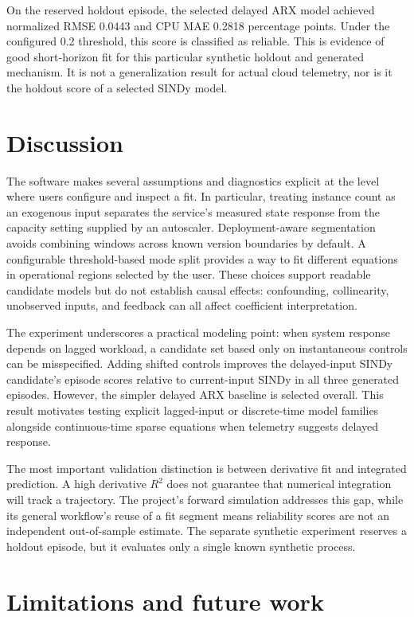 \documentclass[11pt]{article}
\begin{document}
On the reserved holdout episode, the selected delayed ARX model achieved normalized RMSE 0.0443 and CPU MAE 0.2818 percentage points. Under the configured 0.2 threshold, this score is classified as reliable. This is evidence of good short-horizon fit for this particular synthetic holdout and generated mechanism. It is not a generalization result for actual cloud telemetry, nor is it the holdout score of a selected SINDy model.

\section{Discussion}

The software makes several assumptions and diagnostics explicit at the level where users configure and inspect a fit. In particular, treating instance count as an exogenous input separates the service's measured state response from the capacity setting supplied by an autoscaler. Deployment-aware segmentation avoids combining windows across known version boundaries by default. A configurable threshold-based mode split provides a way to fit different equations in operational regions selected by the user. These choices support readable candidate models but do not establish causal effects: confounding, collinearity, unobserved inputs, and feedback can all affect coefficient interpretation.

The experiment underscores a practical modeling point: when system response depends on lagged workload, a candidate set based only on instantaneous controls can be misspecified. Adding shifted controls improves the delayed-input SINDy candidate's episode scores relative to current-input SINDy in all three generated episodes. However, the simpler delayed ARX baseline is selected overall. This result motivates testing explicit lagged-input or discrete-time model families alongside continuous-time sparse equations when telemetry suggests delayed response.

The most important validation distinction is between derivative fit and integrated prediction. A high derivative $R^2$ does not guarantee that numerical integration will track a trajectory. The project's forward simulation addresses this gap, while its general workflow's reuse of a fit segment means reliability scores are not an independent out-of-sample estimate. The separate synthetic experiment reserves a holdout episode, but it evaluates only a single known synthetic process.

\section{Limitations and future work}
\end{document}
